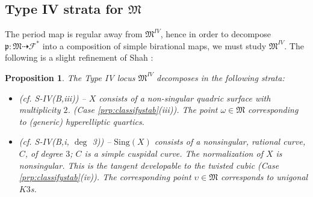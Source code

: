 \documentclass[11pt]{amsart}
\numberwithin{equation}{section}
\theoremstyle{plain}
\newtheorem{proposition}[theorem]{Proposition}
\theoremstyle{remark}
\theoremstyle{definition}
\newcommand{\cF}{\mathscr{F}}
\newcommand{\gp}{\mathfrak{p}}
\newcommand{\Sing}{\mathrm{Sing}}
\newcommand{\gM}{\mathfrak{M}}
\begin{document}
\subsection{Type IV strata for $\gM$} 
%
The period map is regular away from $\gM^{IV}$, hence in order to  decompose $\gp\colon \gM\dashrightarrow \cF^*$
into a composition of simple birational maps, we must study $\gM^{IV}$. The following is  a slight refinement of Shah \cite[Theorem 2.4]{shah4}:


\begin{proposition}\label{prp:proptype4}
The Type IV locus $\gM^{IV}$ decomposes in the following strata:
\begin{itemize}
 \item[IV(0a)] (cf. S-IV(B,iii)) -- $X$ consists of a non-singular quadric surface with multiplicity $2$.  (Case \ref{prp:classifystab}(iii)). The point $\omega\in  \gM$ corresponding to (generic) hyperelliptic quartics. 
   \item[IV(0b)] (cf. S-IV(B,i, $\deg$ 3)) --  $\Sing(X)$ consists of a nonsingular, rational curve, $C$, of degree $3$; $C$ is a simple cuspidal curve. The normalization of $X$ is nonsingular. This is the tangent developable to the twisted cubic (Case \ref{prp:classifystab}(iv)). The corresponding point $\upsilon\in  \gM$  corresponds to unigonal $K3$s.


\end{itemize}
\end{proposition}
\end{document}
